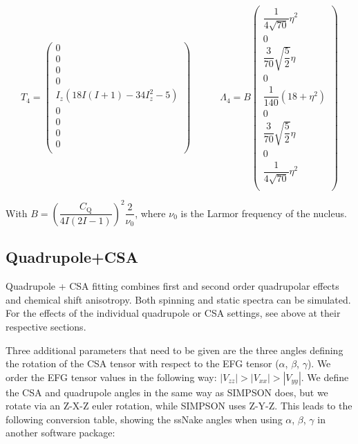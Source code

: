 \documentclass[11pt,a4paper]{article}
\begin{document}
\begin{equation}
  T_{4} = \left( \begin{array}{c}
0 \\
0 \\
0 \\
0 \\
I_z (18 I (I + 1) -34 I_z^2 -5) \\
0 \\
0\\
0 \\
0 \\
  \end{array} \right)
  \quad\quad\quad
  \Lambda_{4} = B
  \left( \begin{array}{c}
\dfrac{1}{4 \sqrt{70}} \eta^2 \\
0 \\
\dfrac{3}{70}  \sqrt{\dfrac{5}{2}} \eta\\
0 \\
 \dfrac{1}{140} (18  + \eta^2) \\
0 \\
\dfrac{3}{70}  \sqrt{\dfrac{5}{2}} \eta\\
0 \\
\dfrac{1}{4 \sqrt{70}} \eta^2 \\
  \end{array} \right)
\end{equation}


With $B = \left( \dfrac{C_\text{Q}}{4 I (2 I - 1)} \right) ^ 2  \dfrac{2}{\nu_0}$, where $\nu_0$ is
the Larmor frequency of the nucleus.


\subsection{Quadrupole+CSA}
Quadrupole + CSA fitting combines first and second order quadrupolar effects and chemical shift anisotropy. 
Both spinning and static spectra can be simulated. For the effects of the individual quadrupole or CSA 
settings, see above at their respective sections.

Three additional parameters that need to be given are the three angles defining the rotation of the CSA 
tensor with respect to the EFG tensor ($\alpha$, $\beta$, $\gamma$).
We order the EFG tensor values in the following way: $|V_{zz}|>|V_{xx}|>|V_{yy}|$.
We define the CSA and quadrupole angles in the same way as SIMPSON does, but we rotate via
an Z-X-Z euler rotation, while SIMPSON uses Z-Y-Z. This leads to the following conversion table, showing 
the ssNake angles when using $\alpha$, $\beta$, $\gamma$ in another software package:
\end{document}
